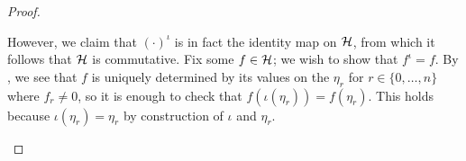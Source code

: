 \begin{proof}
\begin{itemize}
        However, we claim that $(\cdot)^\iota$ is in fact the identity map on $\mathcal{H}$, from which it follows that $\mathcal{H}$ is commutative. Fix some $f\in\mathcal{H}$; we wish to show that $f^\iota=f$. By , we see that $f$ is uniquely determined by its values on the $\eta_r$ for $r\in\{0,\ldots,n\}$ where $f_r\ne0$, so it is enough to check that $f\left(\iota(\eta_r)\right)=f(\eta_r)$. This holds because $\iota(\eta_r)=\eta_r$ by construction of $\iota$ and $\eta_r$.


\end{itemize}
\end{proof}
